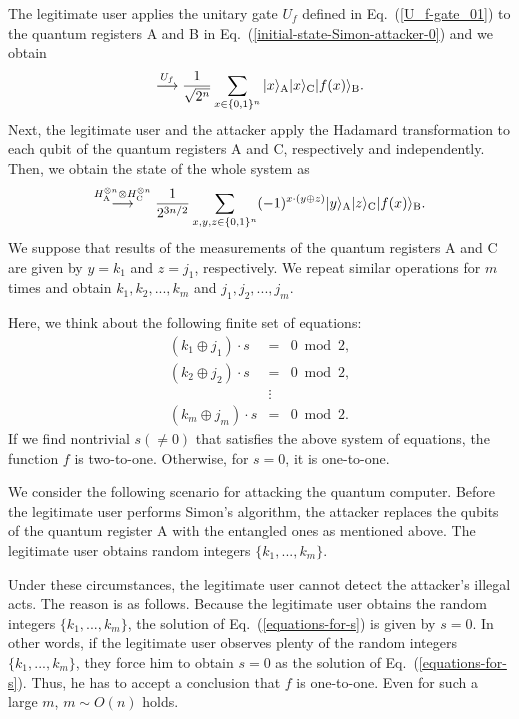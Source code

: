 \documentclass[12pt]{article}
\begin{document}
The legitimate user applies the unitary gate $U_{f}$ defined in Eq.~(\ref{U_f-gate_01}) to the quantum registers A and B
in Eq.~(\ref{initial-state-Simon-attacker-0})
and we obtain
\begin{equation}
\stackrel{U_{f}}{\longrightarrow}
\frac{1}{\sqrt{2^{n}}}
\sum_{x\in\{0,1\}^{n}}
|x\rangle_{\mbox{\scriptsize A}}
|x\rangle_{\mbox{\scriptsize C}}
|f(x)\rangle_{\mbox{\scriptsize B}}.
\end{equation}
Next,
the legitimate user and the attacker apply the Hadamard transformation to each qubit of the quantum registers A and C, respectively and independently.
Then,
we obtain the state of the whole system as
\begin{equation}
\stackrel{H_{\mbox{\tiny A}}^{\otimes n}\otimes H_{\mbox{\tiny C}}^{\otimes n}}{\longrightarrow}
\frac{1}{2^{3n/2}}
\sum_{x,y,z\in\{0,1\}^{n}}
(-1)^{x\cdot(y\oplus z)}
|y\rangle_{\mbox{\scriptsize A}}
|z\rangle_{\mbox{\scriptsize C}}
|f(x)\rangle_{\mbox{\scriptsize B}}.
\end{equation}
We suppose that results of the measurements of the quantum registers A and C are given by $y=k_{1}$ and $z=j_{1}$,
respectively.
We repeat similar operations for $m$ times and obtain
$k_{1},k_{2}, ..., k_{m}$
and
$j_{1},j_{2}, ..., j_{m}$.

Here,
we think about the following finite set of equations:
\begin{eqnarray}
(k_{1}\oplus j_{1})\cdot s
&=&
0 \bmod 2, \nonumber \\
(k_{2}\oplus j_{2})\cdot s
&=&
0 \bmod 2, \nonumber \\
&\vdots& \nonumber \\
(k_{m}\oplus j_{m})\cdot s
&=&
0 \bmod 2.
\label{equations-for-s-attacker}
\end{eqnarray}
If we find nontrivial $s(\neq 0)$ that satisfies the above system of equations,
the function $f$ is two-to-one.
Otherwise, for $s=0$, it is one-to-one.

We consider the following scenario for attacking the quantum computer.
Before the legitimate user performs Simon's algorithm,
the attacker replaces the qubits of the quantum register A with the entangled ones as mentioned above.
The legitimate user obtains random integers $\{k_{1},...,k_{m}\}$.

Under these circumstances,
the legitimate user cannot detect the attacker's illegal acts.
The reason is as follows.
Because the legitimate user obtains the random integers $\{k_{1},...,k_{m}\}$,
the solution of Eq.~(\ref{equations-for-s}) is given by $s=0$.
In other words,
if the legitimate user observes plenty of the random integers $\{k_{1},...,k_{m}\}$,
they force him to obtain $s=0$ as the solution of Eq.~(\ref{equations-for-s}).
Thus,
he has to accept a conclusion that $f$ is one-to-one.
Even for such a large $m$,
$m\sim O(n)$ holds.
\end{document}
